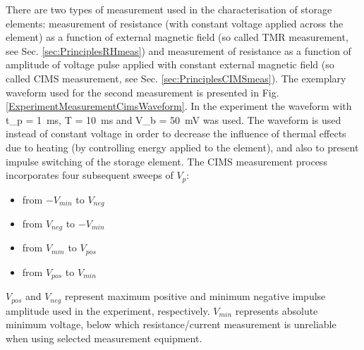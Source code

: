     There are two types of measurement used in the characterisation of storage elements: measurement of resistance (with constant voltage applied across the element) as a function of external magnetic field (so called TMR measurement, see Sec. \ref{sec:PrinciplesRHmeas}) and measurement of resistance as a function of amplitude of voltage pulse applied with constant external magnetic field (so called CIMS measurement, see Sec. \ref{sec:PrinciplesCIMSmeas}). The exemplary waveform used for the second measurement is presented in Fig. \ref{ExperimentMeasurementCimsWaveform}. In the experiment the waveform with \SI[parse-numbers = false, number-math-rm = \ensuremath]{t_p = 1}{\milli\second},  \SI[parse-numbers = false, number-math-rm = \ensuremath]{T = 10}{\milli\second} and \SI[parse-numbers = false, number-math-rm = \ensuremath]{V_b = 50}{\milli\volt} was used. The waveform is used instead of constant voltage in order to decrease the influence of thermal effects due to heating (by controlling energy applied to the element), and also to present impulse switching of the storage element. The CIMS measurement process incorporates four subsequent sweeps of $V_p$:
    
    \begin{itemize}[noitemsep,label=\textbullet]
    	\item from $-V_{min}$ to $V_{neg}$
    	\item from $V_{neg}$ to $-V_{min}$
    	\item from $V_{min}$ to $V_{pos}$
    	\item from $V_{pos}$ to $V_{min}$
    \end{itemize}
    
    $V_{pos}$ and $V_{neg}$ represent maximum positive and minimum negative impulse amplitude used in the experiment, respectively. $V_{min}$ represents absolute minimum voltage, below which resistance/current measurement is unreliable when using selected measurement equipment.
    
